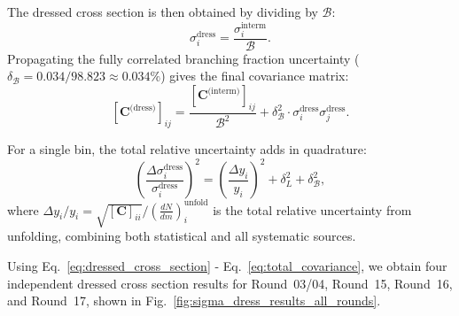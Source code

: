 The dressed cross section is then obtained by dividing by $\mathcal{B}$:
\begin{equation}
    \sigma_i^{\text{dress}} = \frac{\sigma_i^{\text{interm}}}{\mathcal{B}}.
    \label{eq:dressed_cross_section_step}
\end{equation}
Propagating the fully correlated branching fraction uncertainty ($\delta_{\mathcal{B}} = 0.034 / 98.823 \approx 0.034\%$) gives the final covariance matrix:
\begin{equation}
    \left[\mathbf{C}^{\text{(dress)}}\right]_{ij} = \frac{\left[\mathbf{C}^{\text{(interm)}}\right]_{ij}}{\mathcal{B}^2} + \delta_{\mathcal{B}}^2 \cdot \sigma_i^{\text{dress}} \sigma_j^{\text{dress}}.
    \label{eq:total_covariance}
\end{equation}

For a single bin, the total relative uncertainty adds in quadrature:
\begin{equation}
    \left(\frac{\Delta \sigma_i^{\text{dress}}}{\sigma_i^{\text{dress}}}\right)^2 = \left(\frac{\Delta y_i}{y_i}\right)^2 + \delta_L^2 + \delta_{\mathcal{B}}^2,
    \label{eq:relative_error_decomposition}
\end{equation}
where $\Delta y_i / y_i = \sqrt{[\mathbf{C}]_{ii}} / \left( \frac{dN}{dm} \right)^{\text{unfold}}_i$ is the total relative uncertainty from unfolding, combining both statistical and all systematic sources.

Using Eq.~\ref{eq:dressed_cross_section} - Eq.~\ref{eq:total_covariance}, we obtain four independent dressed cross section results for Round~03/04, Round~15, Round~16, and Round~17, shown in Fig.~\ref{fig:sigma_dress_results_all_rounds}.

